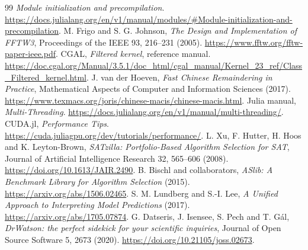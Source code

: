 \documentclass[11pt,a4paper]{article}
\begin{document}
\begin{thebibliography}{99}
\emph{Module initialization and precompilation}.
\url{https://docs.julialang.org/en/v1/manual/modules/#Module-initialization-and-precompilation}.
 M. Frigo and S. G. Johnson,
\emph{The Design and Implementation of FFTW3},
Proceedings of the IEEE 93, 216--231 (2005).
\url{https://www.fftw.org/fftw-paper-ieee.pdf}.
 CGAL, \emph{Filtered kernel},
reference manual.
\url{https://doc.cgal.org/Manual/3.5.1/doc_html/cgal_manual/Kernel_23_ref/Class_Filtered_kernel.html}.
 J. van der Hoeven,
\emph{Fast Chinese Remaindering in Practice},
Mathematical Aspects of Computer and Information Sciences (2017).
\url{https://www.texmacs.org/joris/chinese-macis/chinese-macis.html}.
 Julia manual, \emph{Multi-Threading}.
\url{https://docs.julialang.org/en/v1/manual/multi-threading/}.
 CUDA.jl, \emph{Performance Tips}.
\url{https://cuda.juliagpu.org/dev/tutorials/performance/}.
 L. Xu, F. Hutter, H. Hoos and K. Leyton-Brown,
\emph{SATzilla: Portfolio-Based Algorithm Selection for SAT},
Journal of Artificial Intelligence Research 32, 565--606 (2008).
\url{https://doi.org/10.1613/JAIR.2490}.
 B. Bischl and collaborators,
\emph{ASlib: A Benchmark Library for Algorithm Selection} (2015).
\url{https://arxiv.org/abs/1506.02465}.
 S. M. Lundberg and S.-I. Lee,
\emph{A Unified Approach to Interpreting Model Predictions} (2017).
\url{https://arxiv.org/abs/1705.07874}.
 G. Datseris, J. Isensee, S. Pech and T. Gál,
\emph{DrWatson: the perfect sidekick for your scientific inquiries},
Journal of Open Source Software 5, 2673 (2020).
\url{https://doi.org/10.21105/joss.02673}.
\end{thebibliography}
\end{document}
